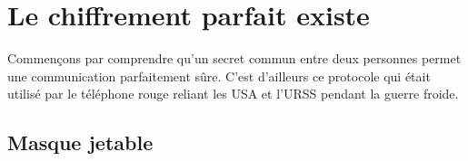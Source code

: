 \documentclass[11pt,class=report,crop=false]{standalone}
\begin{document}






\section{Le chiffrement parfait existe}


Commençons par comprendre qu'un secret commun entre deux personnes permet une communication parfaitement sûre. 
C'est d'ailleurs ce protocole qui était utilisé par le \og{}téléphone rouge\fg{} reliant les USA et l'URSS pendant la guerre froide.

\subsection{Masque jetable}

\end{document}
